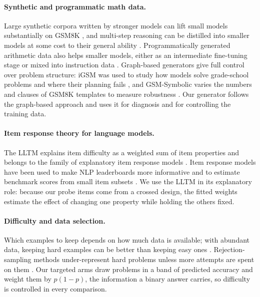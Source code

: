\documentclass[11pt]{article}
\begin{document}
\paragraph{Synthetic and programmatic math data.}
Large synthetic corpora written by stronger models can lift small models substantially on GSM8K \citep{liu2023tinygsm},
and multi-step reasoning can be distilled into smaller models at some cost to their general ability
\citep{fu2023specializing}. Programmatically generated arithmetic data also helps smaller models, either as an
intermediate fine-tuning stage or mixed into instruction data \citep{gangwar2025arith}. Graph-based generators give
full control over problem structure: iGSM was used to study how models solve grade-school problems and where their
planning fails \citep{ye2025physics}, and GSM-Symbolic varies the numbers and clauses of GSM8K \citep{cobbe2021gsm8k}
templates to measure robustness \citep{mirzadeh2024gsmsymbolic}. Our generator follows the graph-based approach and
uses it for diagnosis and for controlling the training data.

\paragraph{Item response theory for language models.}
The LLTM explains item difficulty as a weighted sum of item properties \citep{fischer1973lltm} and belongs to the family
of explanatory item response models \citep{deboeck2004explanatory}. Item response models have been used to make NLP
leaderboards more informative \citep{rodriguez2021leaderboards} and to estimate benchmark scores from small item subsets
\citep{polo2024tiny}. We use the LLTM in its explanatory role: because our probe items come from a crossed design, the
fitted weights estimate the effect of changing one property while holding the others fixed.

\paragraph{Difficulty and data selection.}
Which examples to keep depends on how much data is available; with abundant data, keeping hard examples can be better
than keeping easy ones \citep{sorscher2022pruning}. Rejection-sampling methods under-represent hard problems unless more
attempts are spent on them \citep{tong2024dart}. Our targeted arms draw problems in a band of predicted accuracy and
weight them by $p(1-p)$, the information a binary answer carries, so difficulty is controlled in every comparison.
\end{document}

